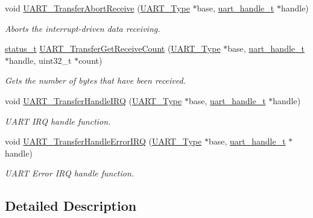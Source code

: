 \begin{DoxyCompactItemize}
void \mbox{\hyperlink{group__uart__driver_gacc35671622b2401545cc55cc6ae572d4}{U\+A\+R\+T\+\_\+\+Transfer\+Abort\+Receive}} (\mbox{\hyperlink{struct_u_a_r_t___type}{U\+A\+R\+T\+\_\+\+Type}} $\ast$base, \mbox{\hyperlink{struct__uart__handle}{uart\+\_\+handle\+\_\+t}} $\ast$handle)
\begin{DoxyCompactList}\small\item\em Aborts the interrupt-\/driven data receiving. \end{DoxyCompactList}\item 
\mbox{\hyperlink{group__ksdk__common_gaaabdaf7ee58ca7269bd4bf24efcde092}{status\+\_\+t}} \mbox{\hyperlink{group__uart__driver_ga05df10f570cdca4ac2dff63b069d254e}{U\+A\+R\+T\+\_\+\+Transfer\+Get\+Receive\+Count}} (\mbox{\hyperlink{struct_u_a_r_t___type}{U\+A\+R\+T\+\_\+\+Type}} $\ast$base, \mbox{\hyperlink{struct__uart__handle}{uart\+\_\+handle\+\_\+t}} $\ast$handle, uint32\+\_\+t $\ast$count)
\begin{DoxyCompactList}\small\item\em Gets the number of bytes that have been received. \end{DoxyCompactList}\item 
void \mbox{\hyperlink{group__uart__driver_gadb0c4f1e5b59db3aa2261df4f5ddb48d}{U\+A\+R\+T\+\_\+\+Transfer\+Handle\+I\+RQ}} (\mbox{\hyperlink{struct_u_a_r_t___type}{U\+A\+R\+T\+\_\+\+Type}} $\ast$base, \mbox{\hyperlink{struct__uart__handle}{uart\+\_\+handle\+\_\+t}} $\ast$handle)
\begin{DoxyCompactList}\small\item\em U\+A\+RT I\+RQ handle function. \end{DoxyCompactList}\item 
void \mbox{\hyperlink{group__uart__driver_gafc364352e879f53138ee1107e3da0a7d}{U\+A\+R\+T\+\_\+\+Transfer\+Handle\+Error\+I\+RQ}} (\mbox{\hyperlink{struct_u_a_r_t___type}{U\+A\+R\+T\+\_\+\+Type}} $\ast$base, \mbox{\hyperlink{struct__uart__handle}{uart\+\_\+handle\+\_\+t}} $\ast$handle)
\begin{DoxyCompactList}\small\item\em U\+A\+RT Error I\+RQ handle function. \end{DoxyCompactList}\end{DoxyCompactItemize}


\subsection{Detailed Description}



